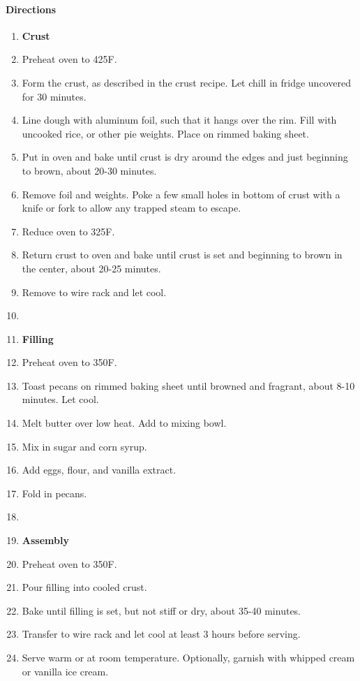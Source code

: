 \documentclass[12pt]{article}
\newenvironment*{directions}
	{
		\paragraph*{Directions}
		\begin{enumerate}
	}
	{
		\end{enumerate}
	}
\begin{document}
	\begin{directions}
		\item[] \textbf{Crust}
		\item Preheat oven to 425F.
		\item Form the crust, as described in the crust recipe. Let chill in fridge uncovered for 30 minutes.
		\item Line dough with aluminum foil, such that it hangs over the rim. Fill with uncooked rice, or other pie weights. Place on rimmed baking sheet.
		\item Put in oven and bake until crust is dry around the edges and just beginning to brown, about 20-30 minutes.
		\item Remove foil and weights. Poke a few small holes in bottom of crust with a knife or fork to allow any trapped steam to escape.
		\item Reduce oven to 325F.
		\item Return crust to oven and bake until crust is set and beginning to brown in the center, about 20-25 minutes.
		\item Remove to wire rack and let cool.
		\item[] \hfill
		\item[] \textbf{Filling}
		\item Preheat oven to 350F.
		\item Toast pecans on rimmed baking sheet until browned and fragrant, about 8-10 minutes. Let cool.
		\item Melt butter over low heat. Add to mixing bowl.
		\item Mix in sugar and corn syrup.
		\item Add eggs, flour, and vanilla extract.
		\item Fold in pecans.
		\item[] \hfill
		\item[] \textbf{Assembly}
		\item Preheat oven to 350F.
		\item Pour filling into cooled crust.
		\item Bake until filling is set, but not stiff or dry, about 35-40 minutes.
		\item Transfer to wire rack and let cool at least 3 hours before serving. \label{make_ahead:pecan_pie}
		\item Serve warm or at room temperature. Optionally, garnish with whipped cream or vanilla ice cream.
	\end{directions}
	
\end{document}
